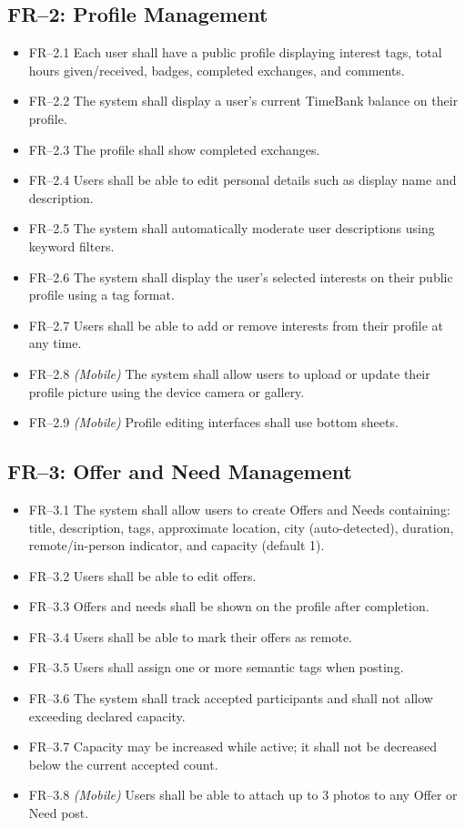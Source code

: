 \documentclass[10pt,a4paper]{report}
\begin{document}
\subsection{FR--2: Profile Management}
\begin{itemize}
    \item FR--2.1 Each user shall have a public profile displaying interest tags, total hours given/received, badges, completed exchanges, and comments.
    \item FR--2.2 The system shall display a user's current TimeBank balance on their profile.
    \item FR--2.3 The profile shall show completed exchanges.
    \item FR--2.4 Users shall be able to edit personal details such as display name and description.
    \item FR--2.5 The system shall automatically moderate user descriptions using keyword filters.
    \item FR--2.6 The system shall display the user's selected interests on their public profile using a tag format.
    \item FR--2.7 Users shall be able to add or remove interests from their profile at any time.
    \item FR--2.8 \textit{(Mobile)} The system shall allow users to upload or update their profile picture using the device camera or gallery.
    \item FR--2.9 \textit{(Mobile)} Profile editing interfaces shall use bottom sheets.
\end{itemize}

\subsection{FR--3: Offer and Need Management}
\begin{itemize}
    \item FR--3.1 The system shall allow users to create Offers and Needs containing: title, description, tags, approximate location, city (auto-detected), duration, remote/in-person indicator, and capacity (default 1).
    \item FR--3.2 Users shall be able to edit offers.
    \item FR--3.3 Offers and needs shall be shown on the profile after completion.
    \item FR--3.4 Users shall be able to mark their offers as remote.
    \item FR--3.5 Users shall assign one or more semantic tags when posting.
    \item FR--3.6 The system shall track accepted participants and shall not allow exceeding declared capacity.
    \item FR--3.7 Capacity may be increased while active; it shall not be decreased below the current accepted count.
    \item FR--3.8 \textit{(Mobile)} Users shall be able to attach up to 3 photos to any Offer or Need post.
\end{itemize}
\end{document}
